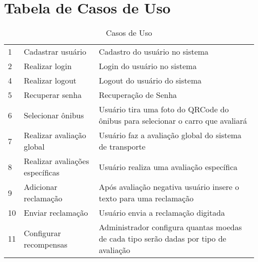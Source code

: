 \section{Tabela de Casos de Uso}\label{sec:TabCasosDeUso}
\begin{table}[H]
	\caption {Casos de Uso}
	\label{tab:casosDeUso}
    \begin{tabular}{lll}
      \toprule
     	\headerCell{Nº} & \headerCell{Caso de Uso} & \headerCell{Descrição} \\
	    \midrule
			1 & Cadastrar usuário                                           & Cadastro do usuário no sistema \\
			2 & Realizar login                                              & Login do usuário no sistema \\
			4 & Realizar logout                                             & Logout do usuário do sistema \\
			5 & Recuperar senha                                             & Recuperação de Senha \\
			6 & Selecionar ônibus                                  & \begin{minipage}{0.5\textwidth}\espacoVert Usuário tira uma foto do QRCode do ônibus para selecionar o carro que avaliará \espacoVert \end{minipage}\\
			7 & Realizar avaliação global                                   & \begin{minipage}{0.5\textwidth}\espacoVert Usuário faz a avaliação global do sistema de transporte \espacoVert \end{minipage}\\
			8 & Realizar avaliações específicas                             & Usuário realiza uma avaliação específica \\
			9 & Adicionar reclamação                                       & \begin{minipage}{0.5\textwidth}\espacoVert Após avaliação negativa usuário insere o texto para uma reclamação \espacoVert \end{minipage} \\
			10 & Enviar reclamação                                          & Usuário envia a reclamação digitada \\
			11 & \begin{minipage}{0.3\textwidth}\espacoVert Configurar recompensas \espacoVert \end{minipage} & \begin{minipage}{0.5\textwidth}\espacoVert Administrador configura quantas moedas de cada tipo serão dadas por tipo de avaliação \espacoVert \end{minipage} \\

\end{tabular}
\end{table}
